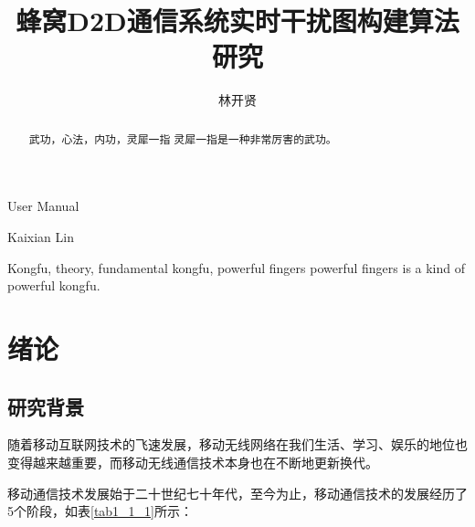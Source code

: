 \documentclass[figurelist,tablelist,algorithmlist,nomlist,masters]{seuthesix}
\begin{document}
	\title{蜂窝D2D通信系统实时干扰图构建算法研究}{}{ User Manual}{}
	\author{林开贤}{Kaixian Lin}
	\authorizedate{\today}
	
	\makecover
	\seudeclare
	
	\begin{abstract}{武功，心法，内功，灵犀一指}
		灵犀一指是一种非常厉害的武功。
	\end{abstract}
	
	\begin{englishabstract}{Kongfu, theory, fundamental kongfu, powerful fingers}
		powerful fingers is a kind of powerful kongfu.
	\end{englishabstract}
	
	\tableofcontents
	\listofothers
	
	\mainmatter
	
	
	\chapter{绪论}
	\section{研究背景}
	
	随着移动互联网技术的飞速发展，移动无线网络在我们生活、学习、娱乐的地位也变得越来越重要，而移动无线通信技术本身也在不断地更新换代。
	
	移动通信技术发展始于二十世纪七十年代，至今为止，移动通信技术的发展经历了5个阶段，如表\ref{tab1_1_1}所示：
\end{document}
